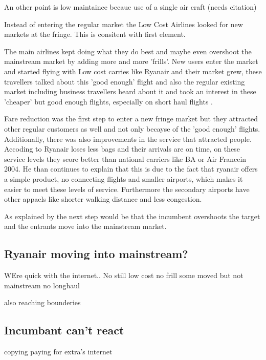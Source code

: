 \documentclass[a4paper, 11pt]{article}
\begin{document}
An other point is low maintaince becaue use of a single air craft (needs citation)

Instead of entering the regular market the Low Cost Airlines looked for new markets at the fringe. This is consitent with \cite{Christensen} first element.

The main airlines kept doing what they do best and maybe even overshoot the mainstream market by adding more and more 'frills'. New users enter the market and started flying with Low cost carries like Ryanair and their market grew, these travellers talked about this 'good enough' flight and also the regular existing market including business travellers heard about it and took an interest in these 'cheaper' but good enough flights, especially on short haul flights \citep{TiddBessant}.

Fare reduction was the first step to enter a new fringe market but they attracted other regular customers as well and not only becayse of the 'good enough' flights. Additionally, there was also improvements in the service that attracted people. Accoding to \cite{Barrett} Ryanair loses less bags and their arrivals are on time, on these service levels they score better than national carriers like BA or Air Francein 2004. He \citep{Barrett} than continues to explain that this is due to the fact that ryanair offers a simple product, no connecting flights and smaller airports, which makes it easier to meet these levels of service. Furthermore the secondary airports have other appaels like shorter walking distance and less congestion.

As explained by \cite{chistensen} the next step would be that the incumbent overshoots the target and the entrants move into the mainstream market.  




\subsection{Ryanair moving into mainstream?}
\label{limits}

WEre quick with the internet..
No still low cost no frill some moved but not mainstream
no longhaul

also reaching bounderies


\subsection{Incumbant can't react}
\label{What did they do}

copying 
paying for extra's
internet
\end{document}
